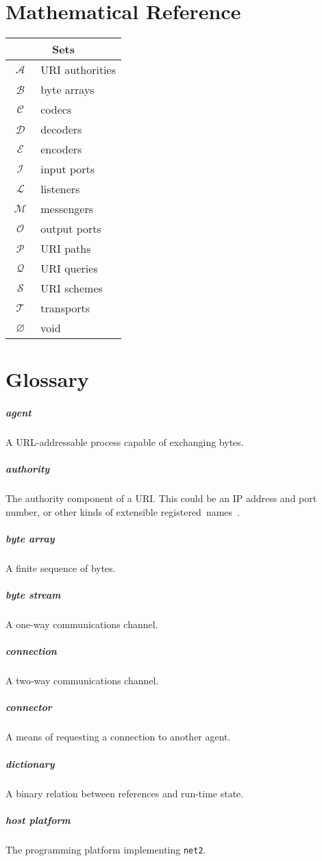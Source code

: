 \documentclass[letterpaper,12pt,openany]{report}
\newcommand{\NetTwo}{\texttt{net2}}
\DeclareMathOperator{\As}{\ensuremath{\mathcal{A}}}
\DeclareMathOperator{\Bs}{\ensuremath{\mathcal{B}}}
\DeclareMathOperator{\Cs}{\ensuremath{\mathcal{C}}}
\DeclareMathOperator{\Ds}{\ensuremath{\mathcal{D}}}
\DeclareMathOperator{\Es}{\ensuremath{\mathcal{E}}}
\DeclareMathOperator{\Is}{\ensuremath{\mathcal{I}}}
\DeclareMathOperator{\Ls}{\ensuremath{\mathcal{L}}}
\DeclareMathOperator{\Ms}{\ensuremath{\mathcal{M}}}
\DeclareMathOperator{\Os}{\ensuremath{\mathcal{O}}}
\DeclareMathOperator{\Ps}{\ensuremath{\mathcal{P}}}
\DeclareMathOperator{\Qs}{\ensuremath{\mathcal{Q}}}
\DeclareMathOperator{\Ss}{\ensuremath{\mathcal{S}}}
\DeclareMathOperator{\Ts}{\ensuremath{\mathcal{T}}}
\DeclareMathOperator{\Void}{\ensuremath{\varnothing}}
\newcommand{\GlossaryItem}[2]{
  \paragraph{#1} #2\vspace{-1ex}
}
\begin{document}
\chapter{Mathematical Reference}

\begin{tabular}{|c|l|}
  \hline
  \multicolumn{2}{|c|}{Sets} \\
  \hline
  $\As$ & URI authorities \\
  $\Bs$ & byte arrays \\
  $\Cs$ & codecs \\
  $\Ds$ & decoders \\
  $\Es$ & encoders \\
  $\Is$ & input ports \\
  $\Ls$ & listeners \\
  $\Ms$ & messengers \\
  $\Os$ & output ports \\
  $\Ps$ & URI paths \\
  $\Qs$ & URI queries \\
  $\Ss$ & URI schemes \\
  $\Ts$ & transports \\
  $\Void$ & void \\
  \hline
\end{tabular}

\chapter{Glossary}
\label{cha:glossary}

\GlossaryItem{agent}{A URL-addressable process capable of exchanging bytes.}

\GlossaryItem{authority}{The authority component of a URI. This could be an IP
  address and port number, or other kinds of extensible
  registered~names~\cite{berners2014rfc}.}

\GlossaryItem{byte array}{A finite sequence of bytes.}

\GlossaryItem{byte stream}{A one-way communications channel.}

\GlossaryItem{connection}{A two-way communications channel.}

\GlossaryItem{connector}{A means of requesting a connection to another agent.}

\GlossaryItem{dictionary}{A binary relation between references and run-time
  state.}

\GlossaryItem{host platform}{The programming platform implementing {\NetTwo}.}
\end{document}
